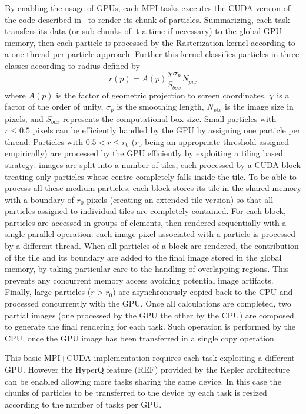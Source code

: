 \documentclass{egpubl}
\begin{document}
By enabling the usage of GPUs, each MPI tasks executes the CUDA version of the code described in~\cite{RGD*14} to render its chunk of particles. 
Summarizing, each task transfers its data (or sub chunks of it a time if necessary) to the global GPU memory, then each particle is processed by the Rasterization kernel according to a one-thread-per-particle approach. Further this kernel classifies particles in three classes according to radius defined by
\begin{equation}
r(p) = A(p)\frac{\chi \sigma_p}{S_{box}}N_{pix} 
\end{equation}
where $A(p)$ is the factor of geometric projection to screen coordinates, $\chi$ is a factor of the order of unity, $\sigma_p$ is the smoothing length, $N_{pix}$ is the image size in pixels, and $S_{box}$ represents the computational box size. Small particles with $r \le 0.5$ pixels can be efficiently handled by the GPU by assigning one particle per thread. Particles with $0.5 < r \le r_0$ ($r_0$ being an appropriate threshold assigned empirically) are processed by the GPU efficiently by exploiting a tiling based strategy: images are split into a number of tiles, each processed by a CUDA block treating only particles whose centre completely falls inside the tile. To be able to process all these medium particles, each block stores its tile in the shared memory with a boundary of $r_0$ pixels (creating an extended tile version) so that all particles assigned to individual tiles are completely contained. For each block, particles are accessed in groups of elements, then rendered sequentially with a single parallel operation: each image pixel associated with a particle is processed by a different thread. When all particles of a block are rendered, the contribution of the tile and its boundary are added to the final image stored in the global memory, by taking particular care to the handling of overlapping regions. This prevents any concurrent memory access avoiding potential image artifacts. Finally, large particles ($r>r_0$) are asynchronously copied back to the CPU and processed concurrently with the GPU.
Once all calculations are completed, two partial images (one processed by the GPU the other by the CPU) are composed to generate the final rendering for each task. Such operation is performed by the CPU, once the GPU image has been transferred in a single copy operation.

This basic MPI+CUDA implementation requires each task exploiting a different GPU. However the HyperQ  feature (REF) provided by the Kepler architecture can be enabled allowing more tasks sharing the same device. In this case the chunks of particles to be transferred to the device by each task is resized according to the number of tasks per GPU.
\end{document}
